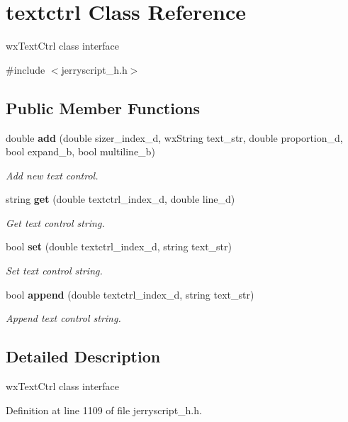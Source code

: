 \section{textctrl Class Reference}
\label{classtextctrl}


wx\+Text\+Ctrl class interface  




{\ttfamily \#include $<$jerryscript\+\_\+h.\+h$>$}

\subsection*{Public Member Functions}
\begin{DoxyCompactItemize}
\item 
double \textbf{ add} (double sizer\+\_\+index\+\_\+d, wx\+String text\+\_\+str, double proportion\+\_\+d, bool expand\+\_\+b, bool multiline\+\_\+b)
\begin{DoxyCompactList}\small\item\em Add new text control. \end{DoxyCompactList}\item 
string \textbf{ get} (double textctrl\+\_\+index\+\_\+d, double line\+\_\+d)
\begin{DoxyCompactList}\small\item\em Get text control string. \end{DoxyCompactList}\item 
bool \textbf{ set} (double textctrl\+\_\+index\+\_\+d, string text\+\_\+str)
\begin{DoxyCompactList}\small\item\em Set text control string. \end{DoxyCompactList}\item 
bool \textbf{ append} (double textctrl\+\_\+index\+\_\+d, string text\+\_\+str)
\begin{DoxyCompactList}\small\item\em Append text control string. \end{DoxyCompactList}\end{DoxyCompactItemize}


\subsection{Detailed Description}
wx\+Text\+Ctrl class interface 

Definition at line 1109 of file jerryscript\+\_\+h.\+h.



